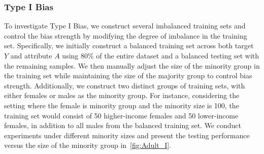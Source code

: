 


\subsubsection{Type I Bias}
To investigate Type I Bias, we construct several imbalanced training sets and control the bias strength by modifying the degree of imbalance in the training set.
Specifically, we initially construct a balanced training set across both target $Y$ and attribute $A$ using 80\% of the entire dataset and a balanced testing set with the remaining samples.
We then manually adjust the size of the minority group in the training set while maintaining the size of the majority group to control bias strength.
Additionally, we construct two distinct groups of training sets, with either females or males as the minority group.
For instance, considering the setting where the female is minority group and the minority size is 100, the training set would consist of 50 higher-income females and 50 lower-income females, in addition to all males from the balanced training set.
We conduct experiments under different minority sizes and present the testing performance versus the size of the minority group in~\cref{fig:Adult_I}.





